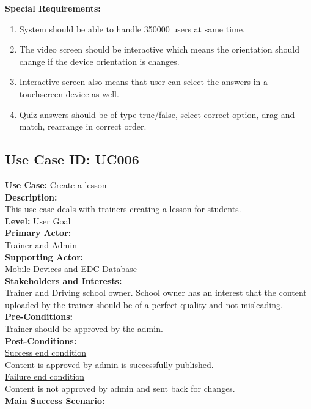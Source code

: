 \documentclass{report}
\begin{document}
\textbf{Special Requirements:}
\begin{enumerate}
    \item System should be able to handle 350000 users at same time.
    \item The video screen should be interactive which means the orientation should change if the device orientation is changes.
    \item Interactive screen also means that user can select the answers in a touchscreen device as well.
    \item Quiz answers should be of type true/false, select correct option, drag and match, rearrange in correct order.
\end{enumerate}

\subsection{\textbf{Use Case ID:} UC006}
\textbf{Use Case:} Create a lesson\\[0.3cm]
\textbf{Description:}\\
This use case deals with trainers creating a lesson for students.\\[0.3cm]
\textbf{Level:} User Goal\\[0.3cm]
\textbf{Primary Actor:}\\
Trainer and Admin\\[0.3cm]
\textbf{Supporting Actor:}\\
Mobile Devices and EDC Database\\[0.3cm]
\textbf{Stakeholders and Interests:}\\
Trainer and Driving school owner. School owner has an interest that the content uploaded by the trainer should be of a perfect quality and not misleading.\\[0.3cm]
\textbf{Pre-Conditions:}\\
Trainer should be approved by the admin.\\[0.3cm]
\textbf{Post-Conditions:}\\
\underline{Success end condition}\\
Content is approved by admin is successfully published.\\[0.3cm]
\underline{Failure end condition}\\
Content is not approved by admin and sent back for changes.\\[0.3cm]
\textbf{\large {Main Success Scenario:}}
\end{document}
